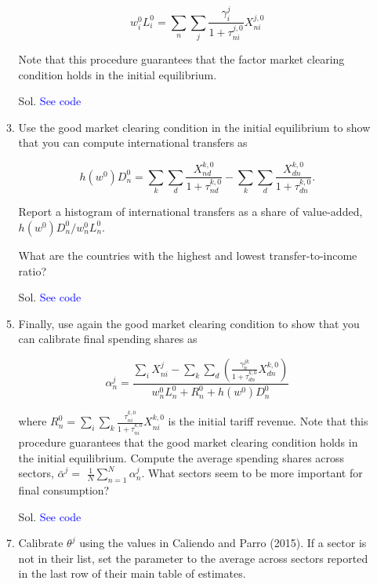 \documentclass[12pt,oneside,reqno]{article}
\begin{document}
\begin{enumerate}[label=\roman*., leftmargin=*]
\begin{enumerate}
\begin{equation*}
w_{i}^{0} L_{i}^{0}=\sum_{n} \sum_{j} \frac{\gamma_{i}^{j}}{1+\tau_{n i}^{j, 0}} X_{n i}^{j, 0}
\end{equation*}

Note that this procedure guarantees that the factor market clearing condition holds in the initial equilibrium.
\item[Sol.] \textcolor{blue}{See code}

\item Use the good market clearing condition in the initial equilibrium to show that you can compute international transfers as

\begin{equation*}
h\left(w^{0}\right) D_{n}^{0}=\sum_{k} \sum_{d} \frac{X_{n d}^{k, 0}}{1+\tau_{n d}^{k, 0}}-\sum_{k} \sum_{d} \frac{X_{d n}^{k, 0}}{1+\tau_{d n}^{k, 0}} .
\end{equation*}

Report a histogram of international transfers as a share of value-added, $h\left(w^{0}\right) D_{n}^{0} / w_{n}^{0} L_{n}^{0}$.

What are the countries with the highest and lowest transfer-to-income ratio?
\item[Sol.] \textcolor{blue}{See code}

\item Finally, use again the good market clearing condition to show that you can calibrate final spending shares as

\begin{equation*}
\alpha_{n}^{j}=\frac{\sum_{i} X_{n i}^{j}-\sum_{k} \sum_{d}\left(\frac{\gamma_{n}^{j k}}{1+\tau_{d n}^{k, 0}} X_{d n}^{k, 0}\right)}{w_{n}^{0} L_{n}^{0}+R_{n}^{0}+h\left(w^{0}\right) D_{n}^{0}}
\end{equation*}

where $R_{n}^{0}=\sum_{i} \sum_{k} \frac{\tau_{n i}^{k, 0}}{1+\tau_{n i}^{k, 0}} X_{n i}^{k, 0}$ is the initial tariff revenue. Note that this procedure guarantees that the good market clearing condition holds in the initial equilibrium. Compute the average spending shares across sectors, $\bar{\alpha}^{j}=$ $\frac{1}{N} \sum_{n=1}^{N} \alpha_{n}^{j}$. What sectors seem to be more important for final consumption?
\item[Sol.] \textcolor{blue}{See code}

\item Calibrate $\theta^{j}$ using the values in Caliendo and Parro (2015). If a sector is not in their list, set the parameter to the average across sectors reported in the last row of their main table of estimates.
\end{enumerate}


\end{enumerate}
\end{document}

